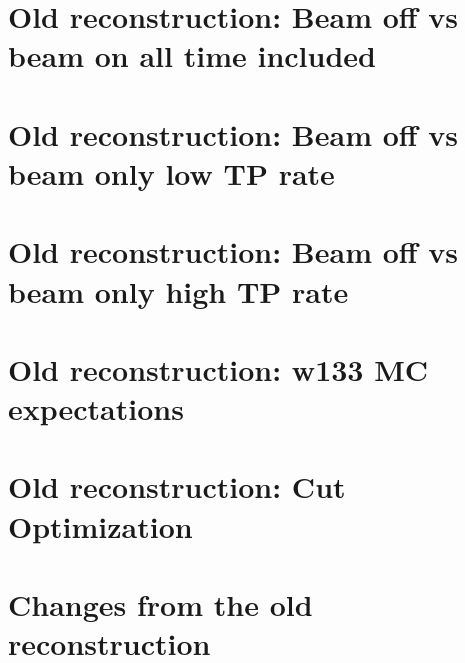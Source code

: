 \documentclass[a4paper,11pt]{article}
\begin{document}
\section{Old reconstruction: Beam off vs beam on all time included}

\clearpage
\section{Old reconstruction: Beam off vs beam only low TP rate}

\clearpage
\section{Old reconstruction: Beam off vs beam only high TP rate}

\clearpage
\section{Old reconstruction: w133 MC expectations}

\clearpage
\section{Old reconstruction: Cut Optimization}

\clearpage
\section{Changes from the old reconstruction}

\clearpage
\end{document}
